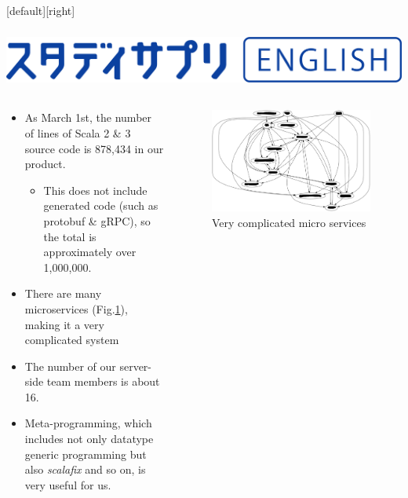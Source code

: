 \begingroup
{}[default][right]

\begin{frame}
  \frametitle{%
    \includegraphics[height=4ex]{img/01_Study_Sapuri_English_Horizontal.png}
  }%

  \begin{columns}
    \begin{column}{0.6\textwidth}
      \begin{itemize}
        \item As March 1st, the number of lines of Scala 2 \& 3 source code is 878,434 in our product.
        \begin{itemize}
          \item This does not include generated code (such as protobuf \& gRPC), so the total is approximately over 1,000,000.
        \end{itemize}

        \item There are many microservices (Fig.\ref{fig:graph}), making it a very complicated system

        \item The number of our server-side team members is about 16.

        \item Meta-programming, which includes not only datatype generic programming but also \emph{scalafix} and so on,
        is very useful for us.
      \end{itemize}
    \end{column}
    \begin{column}{0.4\textwidth}
      \begin{figure}[h]
        \includegraphics[width=\columnwidth]{img/graph.png}
        \caption{Very complicated micro services}
        \label{fig:graph}
      \end{figure}
    \end{column}
  \end{columns}


\end{frame}
